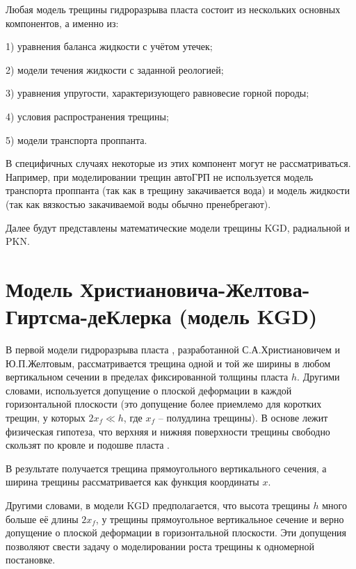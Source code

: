 Любая модель трещины гидроразрыва пласта состоит из нескольких основных компонентов, а именно из:

1) уравнения баланса жидкости с учётом утечек;

2) модели течения жидкости с заданной реологией;

3) уравнения упругости, характеризующего равновесие горной породы;

4) условия распространения трещины;

5) модели транспорта проппанта.

В специфичных случаях некоторые из этих компонент могут не рассматриваться.
Например, при моделировании трещин автоГРП не используется модель транспорта проппанта (так как в трещину закачивается вода) и модель жидкости (так как вязкостью закачиваемой воды обычно пренебрегают).

Далее будут представлены математические модели трещины KGD, радиальной и PKN.

\section{Модель Христиановича-Желтова-Гиртсма-деКлерка (модель KGD)}
\vspace*{-5mm}

В первой модели гидроразрыва пласта \cite{khristianovic_zheltov}, разработанной С.А.Христиановичем и Ю.П.Желтовым, рассматривается трещина одной и той же ширины в любом вертикальном сечении в пределах фиксированной толщины пласта $h$. 
Другими словами, используется допущение о плоской деформации в каждой горизонтальной плоскости (это допущение более приемлемо для коротких трещин, у которых $2x_{\!f}\ll h$, где $x_{\!f}$ -- полудлина трещины).
В основе лежит физическая гипотеза, что верхняя и нижняя поверхности трещины свободно скользят по кровле и подошве пласта \cite{economides}.

В результате получается трещина прямоугольного вертикального сечения, а ширина трещины рассматривается как функция координаты $x$.

Другими словами, в модели KGD предполагается, что высота трещины $h$ много больше её длины $2x_{\!f}$, у трещины прямоугольное вертикальное сечение и верно допущение о плоской деформации в горизонтальной плоскости.
Эти допущения позволяют свести задачу о моделировании роста трещины к одномерной постановке.


